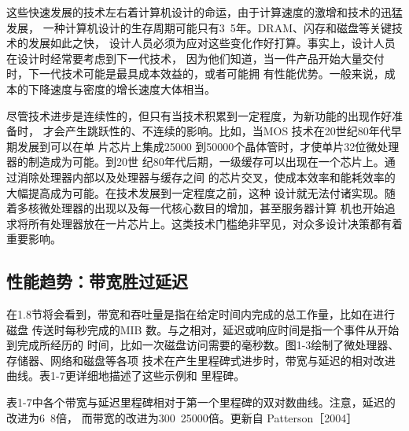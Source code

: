 这些快速发展的技术左右着计算机设计的命运，由于计算速度的激增和技术的迅猛发展，
一种计算机设计的生存周期可能只有3~5年。DRAM、闪存和磁盘等关键技术的发展如此之快，
设计人员必须为应对这些变化作好打算。事实上，设计人员在设计时经常要考虑到下一代技术，
因为他们知道，当一件产品开始大量交付时，下一代技术可能是最具成本效益的，或者可能拥
有性能优势。一般来说，成本的下降速度与密度的增长速度大体相当。

尽管技术进步是连续性的，但只有当技术积累到一定程度，为新功能的出现作好准备时，
才会产生跳跃性的、不连续的影响。比如，当MOS 技术在20世纪80年代早期发展到可以在单
片芯片上集成25000 到50000个晶体管时，才使单片32位微处理器的制造成为可能。到20世
纪80年代后期，一级缓存可以出现在一个芯片上。通过消除处理器内部以及处理器与缓存之间
的芯片交叉，使成本效率和能耗效率的大幅提高成为可能。在技术发展到一定程度之前，这种
设计就无法付诸实现。随着多核微处理器的出现以及每一代核心数目的增加，甚至服务器计算
机也开始追求将所有处理器放在一片芯片上。这类技术门槛绝非罕见，对众多设计决策都有着
重要影响。

\subsection{性能趋势：带宽胜过延迟}
在1.8节将会看到，带宽和吞吐量是指在给定时间内完成的总工作量，比如在进行磁盘
传送时每秒完成的MIB 数。与之相对，延迟或响应时间是指一个事件从开始到完成所经历的
时间，比如一次磁盘访问需要的毫秒数。图1-3绘制了微处理器、存储器、网络和磁盘等各项
技术在产生里程碑式进步时，带宽与延迟的相对改进曲线。表1-7更详细地描述了这些示例和
里程碑。

表1-7中各个带宽与延迟里程碑相对于第一个里程碑的双对数曲线。注意，延迟的改进为6~8倍，
而带宽的改进为300~25000倍。更新自 Patterson［2004］

